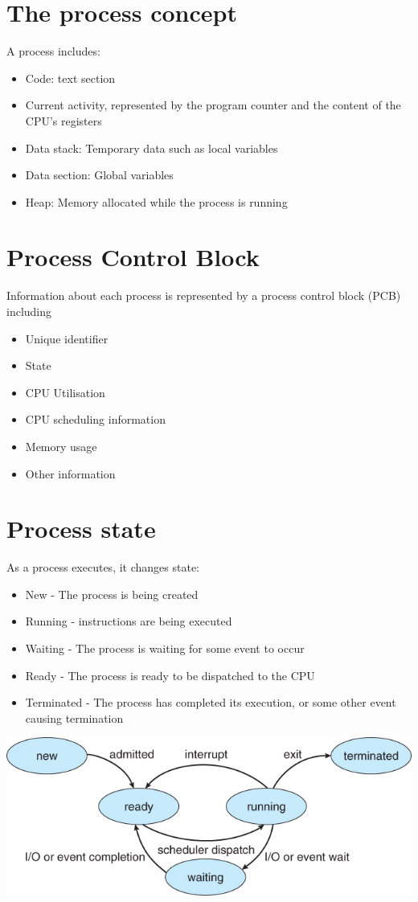 \documentclass{article}[18pt]
\begin{document}
\section{The process concept}
A process includes:
\begin{itemize}
	\item Code: text section
	\item Current activity, represented by the program counter and the content of the CPU's registers
	\item Data stack: Temporary data such as local variables
	\item Data section: Global variables
	\item Heap: Memory allocated while the process is running
\end{itemize}
\section{Process Control Block}
Information about each process is represented by a process control block (PCB) including
\begin{itemize}
	\item Unique identifier
	\item State
	\item CPU Utilisation
	\item CPU scheduling information
	\item Memory usage
	\item Other information
\end{itemize}
\section{Process state}
As a process executes, it changes state:
\begin{itemize}
	\item New - The process is being created
	\item Running - instructions are being executed
	\item Waiting - The process is waiting for some event to occur
	\item Ready - The process is ready to be dispatched to the CPU
	\item Terminated - The process has completed its execution, or some other event causing termination
\end{itemize}
\includegraphics[scale=0.7]{state.jpg}
\end{document}
